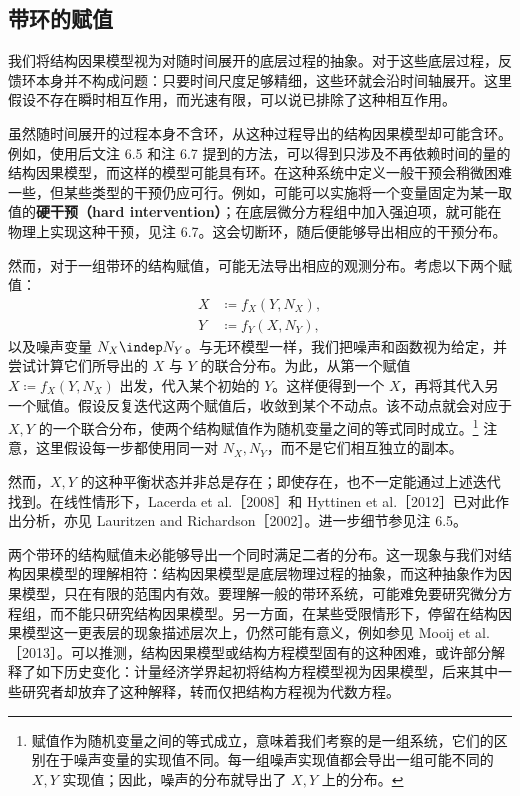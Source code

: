 \subsection{带环的赋值}
\label{sec:ch02-cyclic-assignments}

我们将结构因果模型视为对随时间展开的底层过程的抽象。对于这些底层过程，反馈环本身并不构成问题：只要时间尺度足够精细，这些环就会沿时间轴展开。这里假设不存在瞬时相互作用，而光速有限，可以说已排除了这种相互作用。

虽然随时间展开的过程本身不含环，从这种过程导出的结构因果模型却可能含环。例如，使用后文注 6.5 和注 6.7 提到的方法，可以得到只涉及不再依赖时间的量的结构因果模型，而这样的模型可能具有环。在这种系统中定义一般干预会稍微困难一些，但某些类型的干预仍应可行。例如，可能可以实施将一个变量固定为某一取值的\textbf{硬干预（hard intervention）}；在底层微分方程组中加入强迫项，就可能在物理上实现这种干预，见注 6.7。这会切断环，随后便能够导出相应的干预分布。

然而，对于一组带环的结构赋值，可能无法导出相应的观测分布。考虑以下两个赋值：
\[
 \begin{aligned}
 X&\coloneqq f_X(Y,N_X),\\
 Y&\coloneqq f_Y(X,N_Y),
 \end{aligned}
\]
以及噪声变量 $N_X\indep N_Y$。与无环模型一样，我们把噪声和函数视为给定，并尝试计算它们所导出的 $X$ 与 $Y$ 的联合分布。为此，从第一个赋值 $X\coloneqq f_X(Y,N_X)$ 出发，代入某个初始的 $Y$。这样便得到一个 $X$，再将其代入另一个赋值。假设反复迭代这两个赋值后，收敛到某个不动点。该不动点就会对应于 $X,Y$ 的一个联合分布，使两个结构赋值作为随机变量之间的等式同时成立。\footnote{赋值作为随机变量之间的等式成立，意味着我们考察的是一组系统，它们的区别在于噪声变量的实现值不同。每一组噪声实现值都会导出一组可能不同的 $X,Y$ 实现值；因此，噪声的分布就导出了 $X,Y$ 上的分布。}
注意，这里假设每一步都使用同一对 $N_X,N_Y$，而不是它们相互独立的副本。

然而，$X,Y$ 的这种平衡状态并非总是存在；即使存在，也不一定能通过上述迭代找到。在线性情形下，Lacerda et al.［2008］和 Hyttinen et al.［2012］已对此作出分析，亦见 Lauritzen and Richardson［2002］。进一步细节参见注 6.5。

两个带环的结构赋值未必能够导出一个同时满足二者的分布。这一现象与我们对结构因果模型的理解相符：结构因果模型是底层物理过程的抽象，而这种抽象作为因果模型，只在有限的范围内有效。要理解一般的带环系统，可能难免要研究微分方程组，而不能只研究结构因果模型。另一方面，在某些受限情形下，停留在结构因果模型这一更表层的现象描述层次上，仍然可能有意义，例如参见 Mooij et al.［2013］。可以推测，结构因果模型或结构方程模型固有的这种困难，或许部分解释了如下历史变化：计量经济学界起初将结构方程模型视为因果模型，后来其中一些研究者却放弃了这种解释，转而仅把结构方程视为代数方程。

